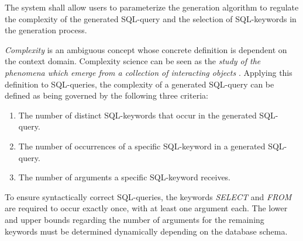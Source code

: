 The system shall allow users to parameterize the generation algorithm to regulate the complexity of the generated SQL-query and the selection of SQL-keywords in the generation process.

\textit{Complexity} is an ambiguous concept whose concrete definition is dependent on the context domain. Complexity science can be seen as the \textit{study of the phenomena which emerge from a collection of interacting objects} \cite{johnson2007two}. Applying this definition to SQL-queries, the complexity of a generated SQL-query can be defined as being governed by the following three criteria:
\begin{enumerate}
 \item The number of distinct SQL-keywords that occur in the generated SQL-query.
 \item The number of occurrences of a specific SQL-keyword in a generated SQL-query.
 \item The number of arguments a specific SQL-keyword receives.
 \end{enumerate}

To ensure syntactically correct SQL-queries, the keywords \textit{SELECT} and \textit{FROM} are required to occur exactly once, with at least one argument each. The lower and upper bounds regarding the number of arguments for the remaining keywords must be determined dynamically depending on the database schema.
